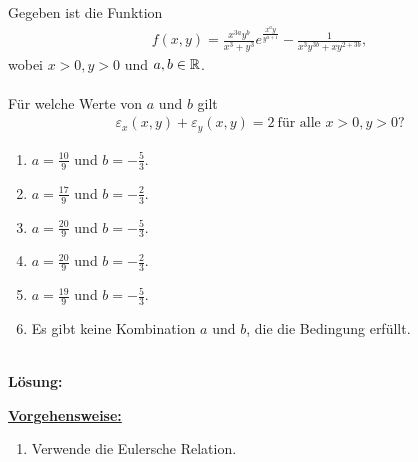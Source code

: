 \subsection*{}
Gegeben ist die Funktion
\begin{align*}
	f(x,y)
	=
	\frac{x^{3a} y^b}{x^3 +y^3} e^{\frac{x^a y}{y^{a+1}}}
	- 
	\frac{1}{x^3 y^{3b} + x y^{2 + 3b}},
\end{align*}
wobei $ x > 0, y > 0 $ und $ a,b \in \mathbb{R} $.\\
\\
Für welche Werte von $ a $ und $ b $ gilt
\begin{align*}
	\varepsilon_x(x,y) + \varepsilon_y(x,y) = 2 \ \textrm{für alle } x>0, y>0\textrm{?}
\end{align*}
\renewcommand{\labelenumi}{(\alph{enumi})}
\begin{enumerate}
	\item 
	$a = \frac{10}{9}$ und $ b=-\frac{5}{3} $.
	\item
	$a = \frac{17}{9}$ und $ b=-\frac{2}{3} $.
	\item
	$a = \frac{20}{9}$ und $ b=-\frac{5}{3} $.
	\item
	$a = \frac{20}{9}$ und $ b=-\frac{2}{3} $.
	\item
	$a = \frac{19}{9}$ und $ b=-\frac{5}{3} $.
	\item
	Es gibt keine Kombination $ a $ und $ b $, die die Bedingung erfüllt.
\end{enumerate}
\ \\
\textbf{Lösung:}
\begin{mdframed}
\underline{\textbf{Vorgehensweise:}}
\renewcommand{\labelenumi}{\theenumi.}
\begin{enumerate}
\item Verwende die Eulersche Relation.
\end{enumerate}
\end{mdframed}

